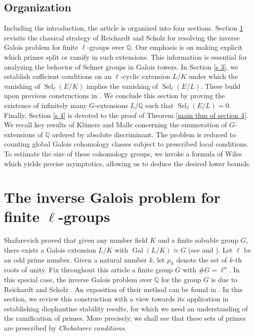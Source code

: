 \documentclass[11pt,reqno]{amsart}
\newcommand{\Q}{\mathbb{Q}}
\newcommand{\op}[1]{\operatorname{#1}}
\numberwithin{equation}{section}
\begin{document}
\subsection{Organization}
Including the introduction, the article is organized into four sections. Section \ref{s 2} revisits the classical strategy of Reichardt \cite{Reichardt} and Scholz \cite{Scholz} for resolving the inverse Galois problem for finite \( \ell \)-groups over \( \Q \). Our emphasis is on making explicit which primes split or ramify in such extensions. This information is essential for analyzing the behavior of Selmer groups in Galois towers. In Section \ref{s 3}, we establish sufficient conditions on an \( \ell \)-cyclic extension \( L/K \) under which the vanishing of \( \operatorname{Sel}_\ell(E/K) \) implies the vanishing of \( \operatorname{Sel}_\ell(E/L) \). These build upon previous constructions in \cite[Section 2]{pathakray}. We conclude this section by proving the existence of infinitely many \( G \)-extensions \( L/\Q \) such that \( \operatorname{Sel}_\ell(E/L) = 0 \). Finally, Section \ref{s 4} is devoted to the proof of Theorem \ref{main thm of section 4}. We recall key results of Kl\"uners and Malle concerning the enumeration of \( G \)-extensions of \( \Q \) ordered by absolute discriminant. The problem is reduced to counting global Galois cohomology classes subject to prescribed local conditions. To estimate the size of these cohomology groups, we invoke a formula of Wiles which yields precise asymptotics, allowing us to deduce the desired lower bounds.



\section{ The inverse Galois problem for finite $\ell$-groups}\label{s 2}
\medskip 

\par Shafarevich proved that given any number field $K$ and a finite solvable group $G$, there exists a Galois extension $L/K$ with $\op{Gal}(L/K)\simeq G$ (see \cite{Shafarevich} and \cite[Chapter IX, Section 6]{NSW}). Let $\ell$ be an odd prime number. Given a natural number $k$, let $\mu_{k}$ denote the set of $k$-th roots of unity. Fix throughout this article a finite group $G$ with $\# G=\ell^n$. In this special case, the inverse Galois problem over $\Q$ for the group $G$ is due to Reichardt \cite{Reichardt} and Scholz \cite{Scholz}. An exposition of their method can be found in \cite{massey2006inverse}. In this section, we review this construction with a view towards its application in establishing diophantine stability results, for which we need an understanding of the ramification of primes. More precisely, we shall see that these sets of primes are prescribed by \emph{Chebotarev conditions}. \\
\end{document}

